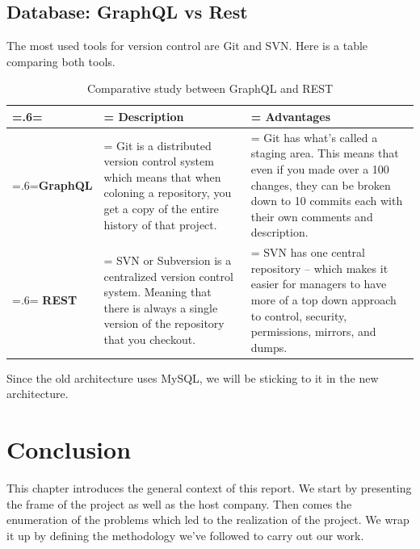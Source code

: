\subsection{Database: GraphQL vs Rest}
The most used tools for version control are Git and SVN. Here is a table comparing both tools.
\begin{table}[H]
	\renewcommand{\arraystretch}{1.5}%
	\caption{Comparative study between GraphQL and REST}
	\centering
	\medskip
	\begin{tabularx}{1\textwidth} {
			| >{\hsize=.6\hsize\linewidth=\hsize\centering\arraybackslash}X
			| >{\hsize=1.2\hsize\linewidth=\hsize\centering\arraybackslash}X
			| >{\hsize=1.2\hsize\linewidth=\hsize\centering\arraybackslash}X |}
		\hline
		\rowcolor{primary} & \textbf {Description}                                                                                                                          & \textbf {Advantages}                                                                                                                                                           \\
		\hline
		\textbf{GraphQL}   & Git is a distributed version control system which means that when coloning a repository, you get a copy of the entire history of that project. & Git has what's called a staging area. This means that even if you made over a 100 changes, they can be broken down to 10 commits each with their own comments and description. \\
		\hline
		\textbf{REST}      & SVN or Subversion is a centralized version control system. Meaning that there is always a single version of the repository that you checkout.  & SVN has one central repository – which makes it easier for managers to have more of a top down approach to control, security, permissions, mirrors, and dumps.                 \\
		\hline
	\end{tabularx}
\end{table}
Since the old architecture uses MySQL, we will be sticking to it in the new architecture.

\setcounter{secnumdepth}{0} %
\section{Conclusion}
This chapter introduces the general context of this report. We start by presenting the frame of the project as well as the host company. Then comes the enumeration of the problems which led to the realization of the project. We wrap it up by defining the methodology we’ve followed to carry out our work. \citep{test1}
